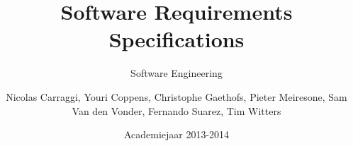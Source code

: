 \author{Nicolas Carraggi, Youri Coppens, Christophe Gaethofs, Pieter Meiresone, Sam Van den Vonder, Fernando Suarez, Tim Witters}
\title{Software Requirements Specifications}
\subtitle{Software Engineering} 
\date{Academiejaar 2013-2014}

\color{pantone418}
\renewcommand{\familydefault}{\sfdefault}
\sansmath
\makeassignment
